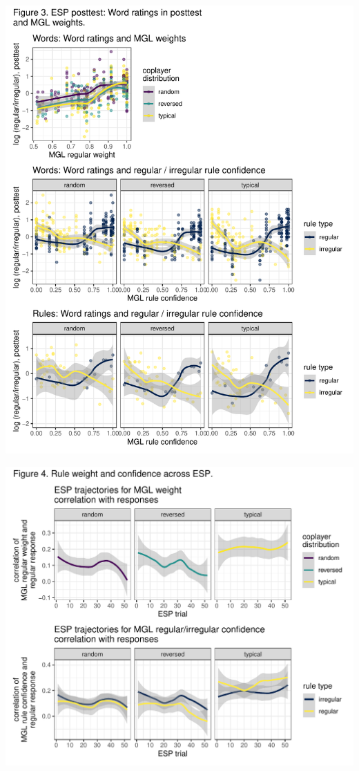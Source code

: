 \documentclass[
]{article}
\begin{document}
\includegraphics{figures/mglbreakdown1-1.pdf}

\includegraphics{figures/mglbreakdown2-1.pdf}
\end{document}
